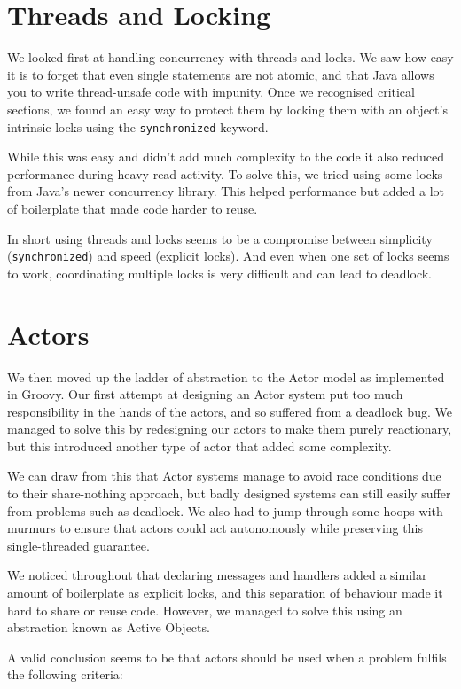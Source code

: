 \documentclass[a4paper,12pt]{kth-mag}
\begin{document}
\section{Threads and Locking}

We looked first at handling concurrency with threads and locks. We saw how easy it is to forget that even single statements are not atomic, and that Java allows you to write thread-unsafe code with impunity. Once we recognised critical sections, we found an easy way to protect them by locking them with an object's intrinsic locks using the \texttt{synchronized} keyword.

While this was easy and didn't add much complexity to the code it also reduced performance during heavy read activity. To solve this, we tried using some locks from Java's newer concurrency library. This helped performance but added a lot of boilerplate that made code harder to reuse.

In short using threads and locks seems to be a compromise between simplicity (\texttt{synchronized}) and speed (explicit locks). And even when one set of locks seems to work, coordinating multiple locks is very difficult and can lead to deadlock.

\section{Actors}

We then moved up the ladder of abstraction to the Actor model as implemented in Groovy. Our first attempt at designing an Actor system put too much responsibility in the hands of the actors, and so suffered from a deadlock bug. We managed to solve this by redesigning our actors to make them purely reactionary, but this introduced another type of actor that added some complexity.

We can draw from this that Actor systems manage to avoid race conditions due to their share-nothing approach, but badly designed systems can still easily suffer from problems such as deadlock. We also had to jump through some hoops with murmurs to ensure that actors could act autonomously while preserving this single-threaded guarantee. 

We noticed throughout that declaring messages and handlers added a similar amount of boilerplate as explicit locks, and this separation of behaviour made it hard to share or reuse code. However, we managed to solve this using an abstraction known as Active Objects.

A valid conclusion seems to be that actors should be used when a problem fulfils the following criteria:
\end{document}
